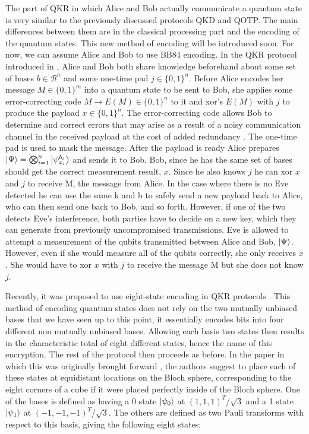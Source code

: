 \documentclass[]{article}
\begin{document}
The part of QKR in which Alice and Bob actually communicate a quantum state is very similar to the previously discussed protocols QKD and QOTP. The main differences between them are in the classical processing part and the encoding of the quantum states. This new method of encoding will be introduced soon. For now, we can assume Alice and Bob to use BB84 encoding. In the QKR protocol introduced in \cite{Leermakers2019}, Alice and Bob both share knowledge beforehand about some set of bases $b \in \mathcal{B}^n$  and some one-time pad $j \in \{0,1\}^n$. Before Alice encodes her message $M \in \{0,1\}^m$ into a quantum state to be sent to Bob, she applies some error-correcting code $M \rightarrow E(M) \in \{0,1\}^n$ to it and xor's $E(M)$ with $j$ to produce the payload $x \in \{0,1\}^n$. The error-correcting code allows Bob to determine and correct errors that may arise as a result of a noisy communication channel in the received payload at the cost of added redundancy \cite{Knill1997}. The one-time pad is used to mask the message. After the payload is ready Alice prepares $\ket{\Psi} = \bigotimes_{i=1}^n \ket{\psi_{x_i}^{b_i}}$ and sends it to Bob. Bob, since he has the same set of bases should get the correct measurement result, $x$. Since he also knows $j$ he can xor $x$ and $j$ to receive M, the message from Alice. In the case where there is no Eve detected he can use the same k and b to safely send a new payload back to Alice, who can then send one back to Bob, and so forth. However, if one of the two detects Eve's interference, both parties have to decide on a new key, which they can generate from previously uncompromised transmissions. Eve is allowed to attempt a measurement of the qubits transmitted between Alice and Bob, $\ket{\Psi}$. However, even if she would measure all of the qubits correctly, she only receives $x$. She would have to xor $x$ with $j$ to receive the message M but she does not know $j$.

Recently, it was proposed to use eight-state encoding in QKR protocols \cite{DeVries2016}. This method of encoding quantum states does not rely on the two mutually unbiased bases that we have seen up to this point, it essentially encodes bits into four different non mutually unbiased bases. Allowing each basis two states then results in the characteristic total of eight different states, hence the name of this encryption. The rest of the protocol then proceeds as before. In the paper in which this was originally brought forward \cite{DeVries2016}, the authors suggest to place each of these states at equidistant locations on the Bloch sphere, corresponding to the eight corners of a cube if it were placed perfectly inside of the Bloch sphere. One of the bases is defined as having a 0 state $\ket{\psi_{0}}$ at $(1,1,1)^T$/$\sqrt{3}$ and a 1 state $\ket{\psi_{1}}$ at $(-1,-1,-1)^T$/$\sqrt{3}$. The others are defined as two Pauli transforms with respect to this basis, giving the following eight states:
\end{document}
